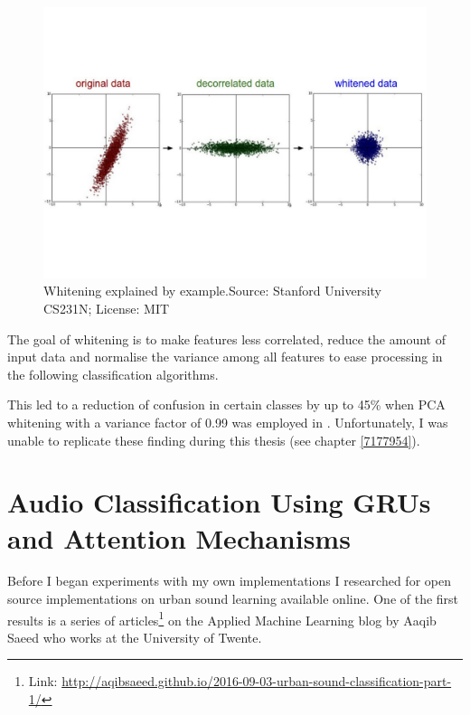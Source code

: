\begin{figure}[h]
    \centering
	\includegraphics[width=.75\textwidth]{./images/illustrations/whitening2}
    \caption{Whitening explained by example.\newline Source: Stanford University CS231N; License: MIT}
    \label{fig:whitening}
\end{figure}


The goal of whitening is to make features less correlated, reduce the amount of input data and normalise the variance among all features to ease processing in the following classification algorithms.

This led to a reduction of confusion in certain classes by up to 45\% when PCA whitening with a variance factor of 0.99 was employed in \cite{7177954}. Unfortunately, I was unable to replicate these finding during this thesis (see chapter \ref{7177954}).













\chapter{Audio Classification Using GRUs and Attention Mechanisms}

Before I began experiments with my own implementations I researched for open source implementations on urban sound learning available online. One of the first results is a series of articles\footnote{Link: \url{http://aqibsaeed.github.io/2016-09-03-urban-sound-classification-part-1/}} on the Applied Machine Learning blog by Aaqib Saeed who works at the University of Twente.


